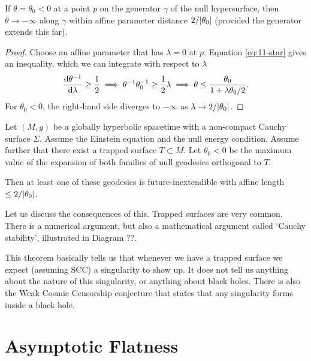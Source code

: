 \begin{corollary}
  If $\theta = \theta_0 < 0$ at a point $p$ on the generator $\gamma$ of the null hypersurface, then $\theta \to - \infty$ along $\gamma$ within affine parameter distance $2 / \abs{\theta_0}$ (provided the generator extends this far).
\end{corollary}
\begin{proof}
  Choose an affine parameter that has $\lambda = 0$  at $p$. 
  Equation \eqref{eq:11-star} gives an inequality, which we can integrate with respect to $\lambda$
  \begin{equation}
    \dv{\theta^{-1}}{\lambda} \geq \frac{1}{2} \implies \theta^{-1} \theta_0^{-1} \geq \frac{1}{2} \lambda \implies \theta \leq \frac{\theta_0}{1 + \lambda \theta_0 / 2}.
  \end{equation}
  For $\theta_0 < 0$, the right-hand side diverges to $- \infty$ as $\lambda \to 2/ \abs{\theta_0}$.
\end{proof}

\begin{theorem}[Penrose 1965]
  Let $(M, g)$ be a globally hyperbolic spacetime with a non-compact Cauchy surface $\Sigma$.
  Assume the Einstein equation and the null energy condition. Assume further that there exist a trapped surface $T \subset M$.
  Let $\theta_0 < 0$ be the maximum value of the expansion of both families of null geodesics orthogonal to $T$.

  Then at least one of these geodesics is future-inextendible with affine length $\leq 2 / \abs{\theta_0}$.
\end{theorem}

Let us discuss the consequences of this.
Trapped surfaces are very common. There is a numerical argument, but also a mathematical argument called `Cauchy stability', illustrated in Diagram ??.

\begin{remark}
  This theorem basically tells us that whenever we have a trapped surface we expect (assuming SCC) a singularity to show up. It does not tell us anything about the nature of this singularity, or anything about black holes.
  There is also the Weak Cosmic Censorship conjecture that states that any singularity forms inside a black hole.
\end{remark}

\chapter{Asymptotic Flatness}%
\label{cha:asymptotic_flatness}

